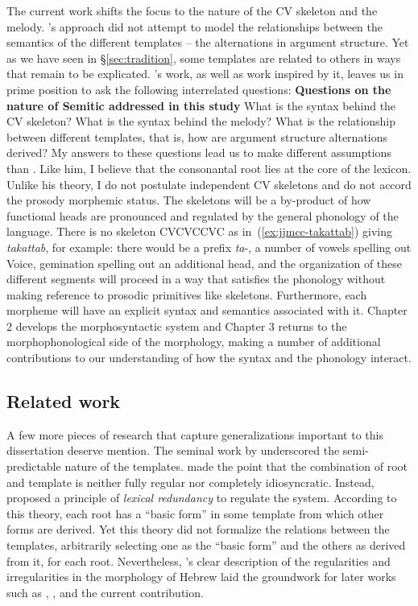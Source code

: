 The current work shifts the focus to the nature of the CV skeleton and the melody. \citeauthor{jjmcc81}'s approach did not attempt to model the relationships between the semantics of the different templates -- the alternations in argument structure. Yet as we have seen in \S\ref{sec:tradition}, some templates are related to others in ways that remain to be explicated. \citeauthor{jjmcc81}'s work{,} as well as work inspired by {it,} leaves us in prime position to ask the following interrelated questions:
\pex \textbf{Questions on the nature of Semitic addressed in this study}
	\a What is the syntax behind the CV skeleton?
	\a What is the syntax behind the melody?
	\a What is the relationship between different templates, that is, how are argument structure alternations derived?
\xe
My answers to these questions lead us to make different assumptions than \citeauthor{jjmcc81}. Like him, I believe that the consonantal root lies at the core of the lexicon. Unlike his theory, I do not postulate independent CV skeletons and do not accord the prosody morphemic status. The skeletons will be a by-product of how functional heads are pronounced and regulated by the general phonology of the language. There is no skeleton CVCVCCVC as in~(\ref{ex:jjmcc-takattab}) giving \emph{takattab}, for example: there would be a prefix \emph{ta}-, a number of vowels spelling out Voice, gemination spelling out an additional head, and the organization of these different segments will proceed in a way that satisfies the phonology without making reference to prosodic primitives like skeletons. Furthermore, each morpheme will have an explicit syntax and semantics associated with it. Chapter 2 develops the morphosyntactic system and Chapter 3 returns to the morphophonological side of the morphology, making a number of additional contributions to our understanding of how the syntax and the phonology interact.
	
	\subsection{Related work}
A few more pieces of research that capture generalizations important to this dissertation deserve mention. The seminal work by \cite{berman78} underscored the semi-predictable nature of the templates. \citet[Ch.~3]{berman78} made the point that the combination of root and template is neither fully regular nor completely idiosyncratic. Instead, \citeauthor{berman78} proposed a principle of \emph{lexical redundancy} to regulate the system. According to this theory, each root has a ``basic form'' in some template from which other forms are derived. Yet this theory did not formalize the relations between the templates, arbitrarily selecting one as the ``basic form'' and the others as derived from it, for each root. Nevertheless, \citeauthor{berman78}'s clear description of the regularities and irregularities in the morphology of Hebrew laid the groundwork for later works such as \cite{doron03}, \cite{arad05}, \cite{borer13oup} and the current contribution.

